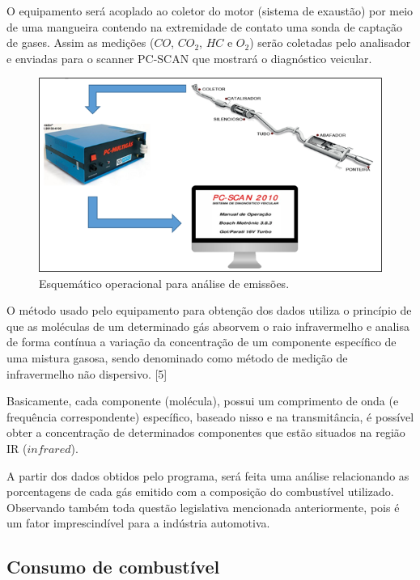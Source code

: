 O equipamento será acoplado ao coletor do motor (sistema de exaustão) por meio de uma mangueira contendo na extremidade de contato uma sonda de captação de gases. Assim as medições ($CO$, $CO_{2}$, $HC$ e $O_{2}$) serão coletadas pelo analisador e enviadas para o scanner PC-SCAN que mostrará o diagnóstico veicular.

\begin{figure}[h!]
	\centering
	\includegraphics[keepaspectratio=true,scale= 1.0]{figuras/esquematico-operacional.png}
	\caption{Esquemático operacional para análise de emissões.}
	\label{esquematico-operacional}
\end{figure}

O método usado pelo equipamento para obtenção dos dados utiliza o princípio de que as moléculas de um determinado gás absorvem o raio infravermelho e analisa de forma contínua a variação da concentração de um componente específico de uma mistura gasosa, sendo denominado como método de medição de infravermelho não dispersivo. [5]

Basicamente, cada componente (molécula), possui um comprimento de onda (e frequência correspondente) específico, baseado nisso e na transmitância, é possível obter a concentração de determinados componentes que estão situados na região IR ($infrared$).

A partir dos dados obtidos pelo programa, será feita uma análise relacionando as porcentagens de cada gás emitido com a composição do combustível utilizado. Observando também toda questão legislativa mencionada anteriormente, pois é um fator imprescindível para a indústria automotiva.

\subsection{Consumo de combustível}

